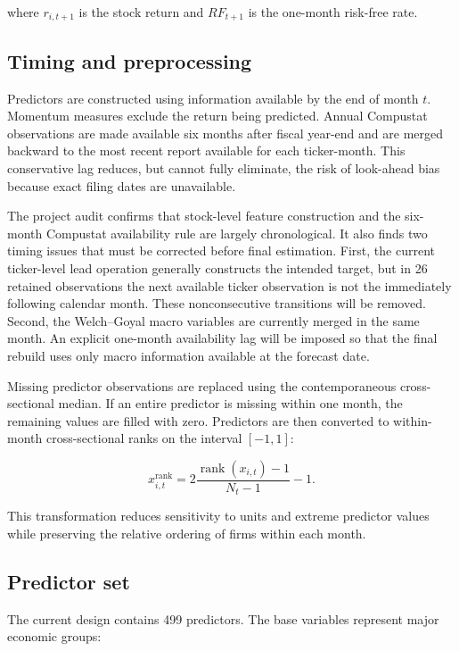 \documentclass[11pt,a4paper]{article}
\begin{document}
where \(r_{i,t+1}\) is the stock return and \(RF_{t+1}\) is the one-month
risk-free rate.

\subsection{Timing and preprocessing}

Predictors are constructed using information available by the end of month
\(t\). Momentum measures exclude the return being predicted. Annual Compustat
observations are made available six months after fiscal year-end and are merged
backward to the most recent report available for each ticker-month. This
conservative lag reduces, but cannot fully eliminate, the risk of look-ahead
bias because exact filing dates are unavailable.

The project audit confirms that stock-level feature construction and the
six-month Compustat availability rule are largely chronological. It also finds
two timing issues that must be corrected before final estimation. First, the
current ticker-level lead operation generally constructs the intended target,
but in 26 retained observations the next available ticker observation is not
the immediately following calendar month. These nonconsecutive transitions
will be removed. Second, the Welch--Goyal macro variables are currently merged
in the same month. An explicit one-month availability lag will be imposed so
that the final rebuild uses only macro information available at the forecast
date.

Missing predictor observations are replaced using the contemporaneous
cross-sectional median. If an entire predictor is missing within one month, the
remaining values are filled with zero. Predictors are then converted to
within-month cross-sectional ranks on the interval \([-1,1]\):

\begin{equation}
 x^{\mathrm{rank}}_{i,t}
 =
 2
 \frac{\operatorname{rank}(x_{i,t})-1}
      {N_t-1}
 -1.
 \label{eq:rank-transform}
\end{equation}

This transformation reduces sensitivity to units and extreme predictor values
while preserving the relative ordering of firms within each month.

\subsection{Predictor set}

The current design contains 499 predictors. The base variables represent major
economic groups:
\end{document}
